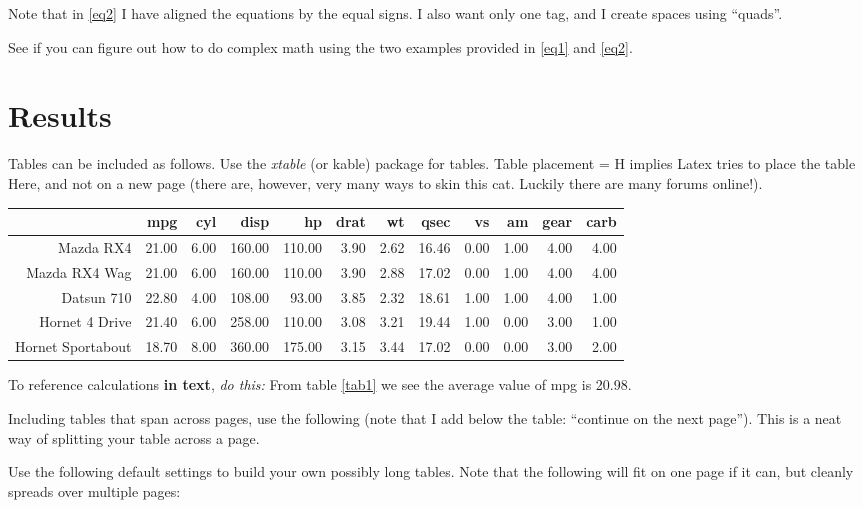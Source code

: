 \documentclass[11pt,preprint, authoryear]{elsarticle}
\let\origtable\table
\let\endorigtable\endtable
\renewenvironment{table}[1][2] {
    \expandafter\origtable\expandafter[H]
} {
    \endorigtable
}
\numberwithin{equation}{section}
\numberwithin{figure}{section}
\numberwithin{table}{section}
\begin{document}
Note that in \ref{eq2} I have aligned the equations by the equal signs.
I also want only one tag, and I create spaces using ``quads''.

See if you can figure out how to do complex math using the two examples
provided in \ref{eq1} and \ref{eq2}.

\section{Results}\label{results}

Tables can be included as follows. Use the \emph{xtable} (or kable)
package for tables. Table placement = H implies Latex tries to place the
table Here, and not on a new page (there are, however, very many ways to
skin this cat. Luckily there are many forums online!).

\begin{table}[H]
\centering
\begin{tabular}{rrrrrrrrrrrr}
  \hline
 & mpg & cyl & disp & hp & drat & wt & qsec & vs & am & gear & carb \\ 
  \hline
Mazda RX4 & 21.00 & 6.00 & 160.00 & 110.00 & 3.90 & 2.62 & 16.46 & 0.00 & 1.00 & 4.00 & 4.00 \\ 
  Mazda RX4 Wag & 21.00 & 6.00 & 160.00 & 110.00 & 3.90 & 2.88 & 17.02 & 0.00 & 1.00 & 4.00 & 4.00 \\ 
  Datsun 710 & 22.80 & 4.00 & 108.00 & 93.00 & 3.85 & 2.32 & 18.61 & 1.00 & 1.00 & 4.00 & 1.00 \\ 
  Hornet 4 Drive & 21.40 & 6.00 & 258.00 & 110.00 & 3.08 & 3.21 & 19.44 & 1.00 & 0.00 & 3.00 & 1.00 \\ 
  Hornet Sportabout & 18.70 & 8.00 & 360.00 & 175.00 & 3.15 & 3.44 & 17.02 & 0.00 & 0.00 & 3.00 & 2.00 \\ 
   \hline
\end{tabular}
\caption{Short Table Example \label{tab1}} 
\end{table}

To reference calculations \textbf{in text}, \emph{do this:} From table
\ref{tab1} we see the average value of mpg is 20.98.

Including tables that span across pages, use the following (note that I
add below the table: ``continue on the next page''). This is a neat way
of splitting your table across a page.

Use the following default settings to build your own possibly long
tables. Note that the following will fit on one page if it can, but
cleanly spreads over multiple pages:
\end{document}
